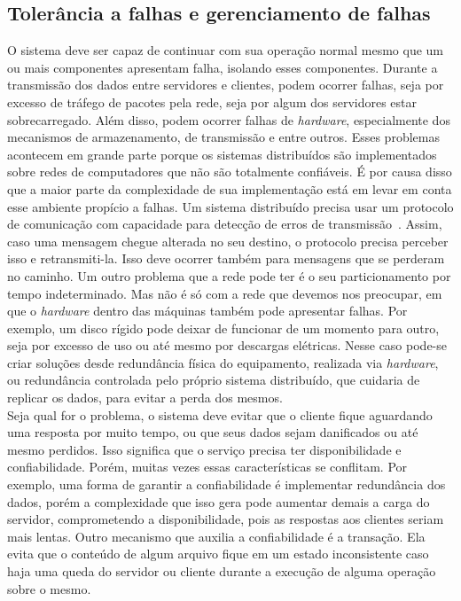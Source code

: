 	\subsection{Tolerância a falhas e gerenciamento de falhas}
	O sistema deve ser capaz de continuar com sua operação normal mesmo que um ou mais componentes apresentam falha, isolando esses componentes.
	Durante a transmissão dos dados entre servidores e clientes, podem ocorrer falhas, seja por excesso de tráfego de pacotes pela rede, seja por algum dos servidores estar sobrecarregado. 
	Além disso, podem ocorrer falhas de \textit{hardware}, especialmente dos mecanismos de armazenamento, de transmissão e entre outros. 
	Esses problemas acontecem em grande parte porque os sistemas distribuídos são implementados sobre redes de computadores que não são totalmente confiáveis. 
	É por causa disso que a maior parte da complexidade de sua implementação está em levar em conta esse ambiente propício a falhas. 
	Um sistema distribuído precisa usar um protocolo de comunicação com capacidade para detecção de erros de transmissão~\cite{kon94}. Assim, caso uma mensagem chegue alterada no seu destino, o protocolo precisa perceber isso e retransmiti-la. 
	Isso deve ocorrer também para mensagens que se perderam no caminho.
	Um outro problema que a rede pode ter é o seu particionamento por tempo indeterminado. 
	Mas não é só com a rede que devemos nos preocupar, em que o \textit{hardware} dentro das máquinas também pode apresentar falhas. 
	Por exemplo, um disco rígido pode deixar de funcionar de um momento para outro, seja por excesso de uso ou até mesmo por descargas elétricas. 
	Nesse caso pode-se criar soluções desde redundância física do equipamento, realizada via \textit{hardware}, ou redundância controlada pelo próprio sistema distribuído, que cuidaria de replicar os dados, para evitar a perda dos mesmos.
	\\
	 
	Seja qual for o problema, o sistema deve evitar que o cliente fique aguardando uma resposta por muito tempo, ou que seus dados sejam danificados ou até mesmo perdidos. Isso significa que o serviço precisa ter disponibilidade e confiabilidade.
	Porém, muitas vezes essas características se conflitam. Por exemplo, uma forma de garantir a confiabilidade é implementar redundância dos dados, porém a complexidade que isso gera pode aumentar demais a carga do servidor, comprometendo a disponibilidade, pois as respostas aos clientes seriam mais lentas.
	Outro mecanismo que auxilia a confiabilidade é a transação. Ela evita que o conteúdo de algum arquivo fique em um estado inconsistente caso haja uma queda do servidor ou cliente durante a execução de alguma operação sobre o mesmo.
	\\
	
